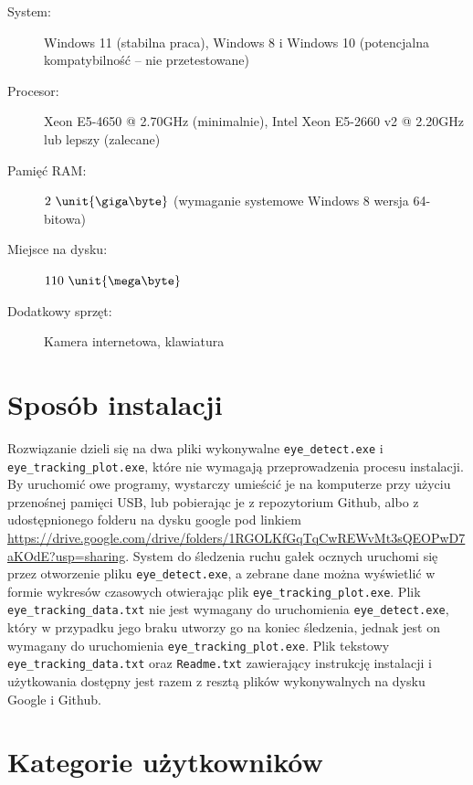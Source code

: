 \documentclass[a4paper,twoside,12pt]{book}
\begin{document}
\begin{description}
	\item[System:] Windows 11 (stabilna praca), Windows 8 i Windows 10 (potencjalna kompatybilność -- nie przetestowane)
	\item[Procesor:] Xeon E5-4650 @ 2.70GHz (minimalnie), Intel Xeon E5-2660 v2 @ 2.20GHz lub lepszy (zalecane)
	\item[Pamięć RAM:] $2 \ \unit{\giga\byte}$ (wymaganie systemowe Windows 8 wersja 64-bitowa)
	\item[Miejsce na dysku:] $110 \ \unit{\mega\byte}$
	\item[Dodatkowy sprzęt:] Kamera internetowa, klawiatura
\end{description}

\section{Sposób instalacji}
\label{sec:Sposob-instalacji}

Rozwiązanie dzieli się na dwa pliki wykonywalne \texttt{eye\_\-detect.exe} \allowbreak i \texttt{eye\_\-tracking\_\-plot.exe}, które nie wymagają przeprowadzenia procesu instalacji. By uruchomić owe programy, wystarczy umieścić je na komputerze przy użyciu przenośnej pamięci USB, lub pobierając je z repozytorium Github, albo z udostępnionego folderu na dysku google pod linkiem \url{https://drive.google.com/drive/folders/1RGOLKfGqTqCwREWvMt3sQEOPwD7aKOdE?usp=sharing}. System do śledzenia ruchu gałek ocznych uruchomi się przez otworzenie pliku \texttt{eye\_detect.exe}, a zebrane dane można wyświetlić w formie wykresów czasowych otwierając plik \texttt{eye\_tracking\_plot.exe}. Plik \texttt{eye\_tracking\_data.txt} nie jest wymagany do uruchomienia \texttt{eye\_detect.exe}, który w przypadku jego braku utworzy go na koniec śledzenia, jednak jest on wymagany do uruchomienia \texttt{eye\_tracking\_plot.exe}. Plik tekstowy \texttt{eye\_tracking\_data.txt} oraz \texttt{Readme.txt} zawierający instrukcję instalacji i użytkowania dostępny jest razem z resztą plików wykonywalnych na dysku Google i Github.

\section{Kategorie użytkowników}
\label{sec:Kategorie-uzytkownikow}
\end{document}
